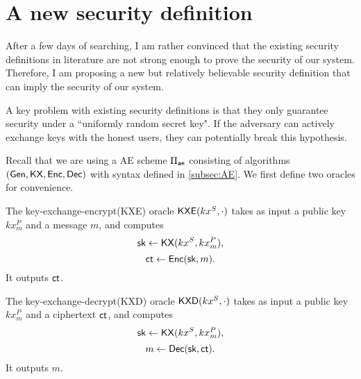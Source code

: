 \section{A new security definition}
\label{sec:IND-CCPKA}
After a few days of searching, I am rather convinced that the existing security definitions in literature are not strong enough to prove the security of our system. Therefore, I am proposing a new but relatively believable security definition that can imply the security of our system.

A key problem with existing security definitions is that they only guarantee security under a ``uniformly random secret key". If the adversary can actively exchange keys with the honest users, they can potentially break this hypothesis.

Recall that we are using a AE scheme $\Pi_{\mathsf{ae}}$ consisting of algorithms $(\mathsf{Gen}, \mathsf{KX}, \mathsf{Enc}, \mathsf{Dec})$ with syntax defined in \cref{subsec:AE}. We first define two oracles for convenience.

\begin{definition}
\label{defn:AE-kxe-oracles}
The key-exchange-encrypt(KXE) oracle $\mathsf{KXE}(kx^S, \cdot)$ takes as input a public key $kx_m^P$ and a message $m$, and computes
$${\mathsf{sk}} \leftarrow \mathsf{KX}(kx^S, kx_m^P),$$
$$\mathsf{ct} \leftarrow \mathsf{Enc}({\mathsf{sk}}, m).$$
It outputs $\mathsf{ct}$.

The key-exchange-decrypt(KXD) oracle $\mathsf{KXD}(kx^S, \cdot)$ takes as input a public key $kx_m^P$ and a ciphertext $\mathsf{ct}$, and computes
$${\mathsf{sk}} \leftarrow \mathsf{KX}(kx^S, kx_m^P),$$
$$m \leftarrow \mathsf{Dec}({\mathsf{sk}}, \mathsf{ct}).$$
It outputs $m$.
\end{definition}

